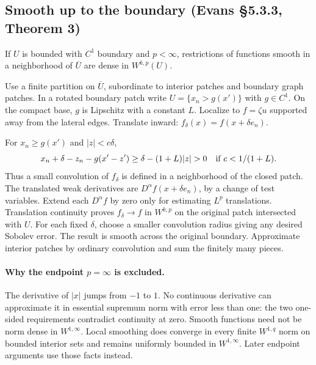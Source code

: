 \subsection{Smooth up to the boundary (Evans \S5.3.3, Theorem 3)}
\begin{theorem}\label{thm:5-boundary-density}
If $U$ is bounded with $C^1$ boundary and $p<\infty$, restrictions of
functions smooth in a neighborhood of $\overline U$ are dense in $W^{k,p}(U)$.
\end{theorem}
\begin{expandedproof}
Use a finite partition on $\overline U$, subordinate to interior patches
and boundary graph patches. In a rotated boundary patch write
$U=\{x_n>g(x')\}$ with $g\in C^1$. On the compact base, $g$ is
Lipschitz with a constant $L$. Localize to $f=\zeta u$ supported away
from the lateral edges. Translate inward:
$f_\delta(x)=f(x+\delta e_n)$.

For $x_n\geq g(x')$ and $|z|<c\delta$,
\[
 x_n+\delta-z_n-g(x'-z')
 \geq\delta-(1+L)|z|>0
 \quad\hbox{if }c<1/(1+L).
\]
Thus a small convolution of $f_\delta$ is defined in a neighborhood of
the closed patch. The translated weak derivatives are
$D^\alpha f(x+\delta e_n)$, by a change of test variables.
Extend each $D^\alpha f$ by zero only for estimating $L^p$ translations.
Translation continuity proves $f_\delta\to f$ in $W^{k,p}$ on the
original patch intersected with $U$. For each fixed $\delta$, choose
a smaller convolution radius giving any desired Sobolev error.
The result is smooth across the original boundary. Approximate interior
patches by ordinary convolution and sum the finitely many pieces.
\end{expandedproof}
\Needspace{45mm}

\paragraph{Why the endpoint $p=\infty$ is excluded.}
The derivative of $|x|$ jumps from $-1$ to $1$. No continuous derivative
can approximate it in essential supremum norm with error less than one:
the two one-sided requirements contradict continuity at zero. Smooth
functions need not be norm dense in $W^{1,\infty}$.
Local smoothing does converge in every finite $W^{1,q}$ norm on bounded
interior sets and remains uniformly bounded in $W^{1,\infty}$. Later
endpoint arguments use those facts instead.
